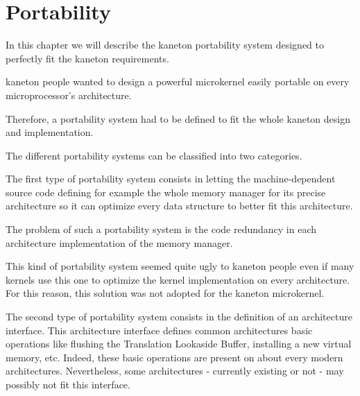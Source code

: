 %
%
%
%
%
%

%
%

\chapter{Portability}
\label{chapter:portability}

In this chapter we will describe the kaneton portability system designed
to perfectly fit the kaneton requirements.

\newpage

%
%

kaneton people wanted to design a powerful microkernel easily portable
on every microprocessor's architecture.

Therefore, a portability system had to be defined to fit the whole kaneton
design and implementation.

The different portability systems can be classified into two categories.

The first type of portability system consists in letting the
machine-dependent source code defining for example the whole memory manager
for its precise architecture so it can optimize every data structure to
better fit this architecture.

The problem of such a portability system is the code redundancy in each
architecture implementation of the memory manager.

This kind of portability system seemed quite ugly to kaneton people
even if many kernels use this one to optimize the kernel implementation
on every architecture. For this reason, this solution was not adopted
for the kaneton microkernel.

The second type of portability system consists in the definition of
an architecture interface. This architecture interface defines common
architectures basic operations like flushing the Translation Lookaside Buffer,
installing a new virtual memory, etc. Indeed, these basic operations
are present on about every modern architectures. Nevertheless, some
architectures - currently existing or not - may possibly not fit this
interface.

